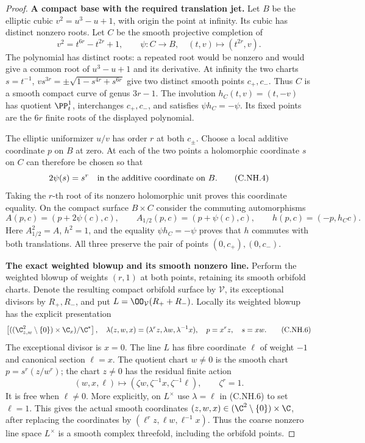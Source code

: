 \begin{proof}
\par\medskip\noindent\textbf{A compact base with the required translation jet.}
Let $B$ be the elliptic cubic $v^2=u^3-u+1$, with origin the
point at infinity. Its cubic has distinct nonzero roots. Let
$C$ be the smooth projective completion of
\[
 v^2=t^{6r}-t^{2r}+1,
 \qquad \psi:C\longrightarrow B,\quad
          (t,v)\longmapsto(t^{2r},v).
                                                        \tag{C.NH.3}
\]
The polynomial has distinct roots: a repeated root would be
nonzero and would give a common root of $u^3-u+1$ and its
derivative. At infinity the two charts
$s=t^{-1}$, $v s^{3r}=\pm\sqrt{1-s^{4r}+s^{6r}}$ give two
distinct smooth points $c_+,c_-$. Thus $C$ is a smooth compact
curve of genus $3r-1$. The involution $h_C(t,v)=(t,-v)$ has
quotient $\PP^1_t$, interchanges $c_+,c_-$, and satisfies
$\psi h_C=-\psi$. Its fixed points are the $6r$ finite roots
of the displayed polynomial.

The elliptic uniformizer $u/v$ has order $r$ at both
$c_\pm$. Choose a local additive coordinate $p$ on $B$ at
zero. At each of the two points a holomorphic coordinate
$s$ on $C$ can therefore be chosen so that
\[
 2\psi(s)=s^r\quad\hbox{in the additive coordinate on }B.
                                                        \tag{C.NH.4}
\]
Taking the $r$-th root of its nonzero holomorphic unit proves
this coordinate equality. On the compact surface $B\times C$
consider the commuting automorphisms
\[
 A(p,c)=(p+2\psi(c),c),\qquad
 A_{1/2}(p,c)=(p+\psi(c),c),\qquad
 h(p,c)=(-p,h_Cc).
                                                        \tag{C.NH.5}
\]
Here $A_{1/2}^2=A$, $h^2=1$, and the equality
$\psi h_C=-\psi$ proves that $h$ commutes with both
translations. All three preserve the pair of points
$(0,c_+),(0,c_-)$.

\par\medskip\noindent\textbf{The exact weighted blowup and its smooth nonzero line.}
Perform the weighted blowup of weights $(r,1)$ at both
points, retaining its smooth orbifold charts. Denote the
resulting compact orbifold surface by $\mathcal V$, its
exceptional divisors by $R_+,R_-$, and put
$L=\OO_{\mathcal V}(R_++R_-)$. Locally its weighted blowup
has the explicit presentation
\[
 \left[((\C^2_{z,w}\setminus\{0\})\times\C_x)/\C^*\right],
 \quad \lambda(z,w,x)=(\lambda^r z,\lambda w,\lambda^{-1}x),
 \quad p=x^r z,\quad s=xw.
                                                        \tag{C.NH.6}
\]
The exceptional divisor is $x=0$. The line $L$ has fibre
coordinate $\ell$ of weight $-1$ and canonical section
$\ell=x$. The quotient chart $w\ne0$ is the smooth chart
$p=s^r(z/w^r)$; the chart $z\ne0$ has the residual finite
action
\[
 (w,x,\ell)\longmapsto
      (\zeta w,\zeta^{-1}x,\zeta^{-1}\ell),\qquad \zeta^r=1.
                                                        \tag{C.NH.7}
\]
It is free when $\ell\ne0$. More explicitly, on $L^\times$
use $\lambda=\ell$ in (C.NH.6) to set $\ell=1$. This gives
the actual smooth coordinates
$(z,w,x)\in(\C^2\setminus\{0\})\times\C$, after replacing
the coordinates by $(\ell^rz,\ell w,\ell^{-1}x)$.
Thus the coarse nonzero line space $L^\times$ is a smooth
complex threefold, including the orbifold points.


\end{proof}
